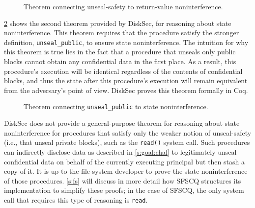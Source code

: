 \begin{figure}[ht]
  
  \caption{Theorem connecting unseal-safety to return-value noninterference.}
  \label{fig:unseal-to-ret}
\end{figure}

\ref{fig:unseal-to-state} shows the second theorem provided by DiskSec,
for reasoning about state noninterference.  This theorem requires that
the procedure satisfy the stronger definition, \texttt{unseal\_public}, to
ensure state noninterference.  The intuition for why this theorem is
true lies in the fact that a procedure that unseals only public blocks
cannot obtain any confidential data in the first place.  As a result,
this procedure's execution will be identical regardless of the contents of
confidential blocks, and thus the state after this procedure's execution
will remain equivalent from the adversary's point of view.  DiskSec proves
this theorem formally in Coq.

\begin{figure}[ht]
  
  \caption{Theorem connecting \texttt{unseal\_public} to state noninterference.}
  \label{fig:unseal-to-state}
\end{figure}

DiskSec does not provide a general-purpose theorem for reasoning about state
noninterference for procedures that satisfy only the weaker notion of
unseal-safety (i.e., that unseal private blocks), such as the \texttt{read()}
system call.  Such procedures can indirectly disclose data as
described in \ref{s:goal:chal} to legitimately unseal confidential
data on behalf of the currently executing principal but then stash a
copy of it.  It is up to the file-system developer to prove the state
noninterference of those procedures.  \ref{s:fs} will discuss in
more detail how SFSCQ structures its implementation to simplify these
proofs; in the case of SFSCQ, the only system call that requires this
type of reasoning is \texttt{read}.
